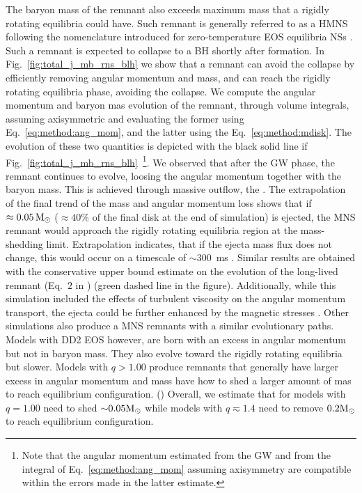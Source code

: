 The baryon mass of the remnant also exceeds maximum mass that a rigidly rotating 
equilibria could have. Such remnant is generally referred to as a \ac{HMNS} following the 
nomenclature introduced for zero-temperature \ac{EOS} equilibria \acp{NS} \citep{Baumgarte:1999cq}.
Such a remnant is expected to collapse to a \ac{BH} shortly after formation. 
In Fig.~\ref{fig:total_j_mb_rns_blh} we show that a remnant can avoid the collapse by 
efficiently removing angular momentum and mass, and can reach the rigidly rotating equilibria phase,
avoiding the collapse.
%
We compute the angular momentum and baryon mas evolution of the remnant, 
through volume integrals, assuming axisymmetric and evaluating the former using 
Eq.~\eqref{eq:method:ang_mom}, and the latter using the Eq.~\eqref{eq:method:mdisk}. 
The evolution of these two quantities is depicted with the black solid line if 
Fig.~\eqref{fig:total_j_mb_rns_blh}~\footnote{
    Note that the angular momentum estimated
    from the \ac{GW} and from the integral of Eq.~\eqref{eq:method:ang_mom} assuming
    axisymmetry are compatible within the errors made in the latter estimate.
}.
%
We observed that after the \ac{GW} phase, the remnant continues to evolve, loosing the 
angular momentum together with the baryon mass. This is achieved through massive outflow,
the \swind{}. 
%
The extrapolation of the final trend of the mass and angular momentum loss shows that 
if $\approx0.05\,{\text{M}_{\odot}}$ ($\approx40$\% of the final disk at the end of simulation) is 
ejected, the \ac{MNS} remnant would approach the rigidly rotating equilibria region 
at the mass-shedding limit. Extrapolation indicates, that if the ejecta mass flux does 
not change, this would occur on a timescale of $\sim 300$~ms \pmerg{}.
%
Similar results are obtained with the conservative upper bound estimate on the 
evolution of the long-lived remnant (Eq.~$2$ in \citet{Radice:2018xqa}) (green dashed line in 
the figure). 
Additionally, while this simulation included the effects of turbulent viscosity on the
angular momentum transport, the ejecta could be further enhanced by the magnetic stresses 
\citep{Metzger:2006mw,Bucciantini:2011kx,Siegel:2017nub,Fernandez:2018kax,Ciolfi:2020hgg}.
%
%
Other simulations also produce a \ac{MNS} remnants with a similar evolutionary paths. 
Models with DD2 \ac{EOS} however, are born with an excess in angular momentum but not in 
baryon mass. They also evolve toward the rigidly rotating equilibria but slower.
Models with $q>1.00$ produce remnants that generally have larger excess in angular momentum 
and mass have how to shed a larger amount of mas to reach equilibrium configuration.
()
Overall, we estimate that for models with $q=1.00$ need to shed ${\sim}0.05{\text{M}_{\odot}}$ while 
models with $q\eqsim 1.4$ need to remove $0.2{\text{M}_{\odot}}$ to reach equilibrium configuration.















